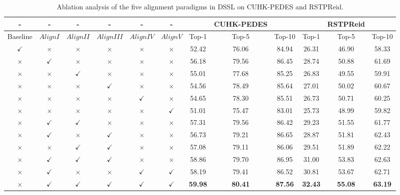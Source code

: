 \documentclass[sigconf]{acmart}
\begin{document}
\begin{table*}
	\caption{Ablation analysis of the five alignment paradigms in DSSL on CUHK-PEDES and RSTPReid.}
	\label{tab:alignment}
	\begin{tabular}{c |ccccc|ccc | ccc}
		\toprule
		- & - & - & - & - & - & & CUHK-PEDES & & & RSTPReid &\\
		\midrule
		Baseline & $Align I$ & $Align II$ & $Align III$ & $Align IV$ & $Align V$ & Top-1 & Top-5 & Top-10 & Top-1 & Top-5 & Top-10 \\
		\midrule		
		$\checkmark$ & $\times$ & $\times$ & $\times$ & $\times$ & $\times$ & 52.42 & 76.06 & 84.94 & 26.31 & 46.90 & 58.33 \\
		\midrule
		$\times$ & $\checkmark$ & $\times$ & $\times$ & $\times$ & $\times$ & 56.18 & 79.56 & 86.45 & 28.74 & 50.88 & 61.69 \\
		$\times$ & $\times$ & $\checkmark$ & $\times$ & $\times$ & $\times$ & 55.01 & 77.68 & 85.25 & 26.83 & 49.55 & 59.91 \\
		$\times$ & $\times$ & $\times$ & $\checkmark$ & $\times$ & $\times$ & 54.56 & 78.49 & 85.64 & 27.01 & 50.02 & 60.67 \\
		$\times$ & $\times$ & $\times$ & $\times$ & $\checkmark$ & $\times$ & 54.65 & 78.30 & 85.51 & 26.73 & 50.71 & 60.25 \\
		$\times$ & $\times$ & $\times$ & $\times$ & $\times$ & $\checkmark$ & 51.01 & 75.47 & 83.01 & 25.73 & 48.99 & 59.82 \\
		$\times$ & $\checkmark$ & $\checkmark$ & $\times$ & $\times$ & $\times$ & 57.31 & 79.56 & 86.42 & 29.23 & 51.55 & 61.77 \\
		$\times$ & $\checkmark$ & $\times$ & $\checkmark$ & $\times$ & $\times$ & 56.73 & 79.21 & 86.65 & 28.87 & 51.81 & 62.43 \\
		$\times$ & $\times$ & $\checkmark$ & $\checkmark$ & $\times$ & $\times$ & 57.08 & 79.11 & 86.06 & 29.51 & 51.89 & 62.22\\
		$\times$ & $\checkmark$ & $\checkmark$ & $\checkmark$ & $\times$ & $\times$ & 58.86 & 79.70 & 86.95 & 31.00 & 53.83 & 62.63 \\
		$\times$ & $\checkmark$ & $\times$ & $\times$ & $\checkmark$ & $\checkmark$ & 58.19 & 79.41 & 86.52 & 30.81 & 53.67 & 62.71 \\
		\midrule
		$\times$ & $\checkmark$ & $\checkmark$ & $\checkmark$ & $\checkmark$ & $\checkmark$ & \textbf{59.98} & \textbf{80.41} & \textbf{87.56} & \textbf{32.43} & \textbf{55.08} & \textbf{63.19} \\
		\bottomrule
	\end{tabular}
\end{table*}
\end{document}

